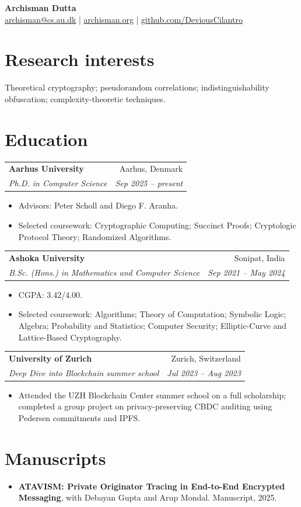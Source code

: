 \documentclass[10pt,a4paper]{article}
\makeatletter
\newcommand{\cvheading}[4]{%
  \begin{tabular*}{\textwidth}{@{\extracolsep{\fill}} l r}
    \textbf{#1} & #2 \\
    \emph{#3} & \emph{#4}
  \end{tabular*}
  \vspace{-0.35em}
}
\makeatother
\begin{document}
\begin{center}
  {\LARGE \textbf{Archisman Dutta}}\\[0.35em]
  \href{mailto:archisman@cs.au.dk}{archisman@cs.au.dk} \;|\;
  \href{https://archisman.org}{archisman.org} \;|\;
  \href{https://github.com/DeviousCilantro}{github.com/DeviousCilantro}
\end{center}

\section*{Research interests}
Theoretical cryptography; pseudorandom correlations; indistinguishability obfuscation; complexity-theoretic techniques.

\section*{Education}
\cvheading{Aarhus University}{Aarhus, Denmark}{Ph.D. in Computer Science}{Sep 2025 -- present}
\begin{itemize}
  \item Advisors: Peter Scholl and Diego F. Aranha.
  \item Selected coursework: Cryptographic Computing; Succinct Proofs; Cryptologic Protocol Theory; Randomized Algorithms.
\end{itemize}

\cvheading{Ashoka University}{Sonipat, India}{B.Sc. (Hons.) in Mathematics and Computer Science}{Sep 2021 -- May 2024}
\begin{itemize}
  \item CGPA: 3.42/4.00.
  \item Selected coursework: Algorithms; Theory of Computation; Symbolic Logic; Algebra; Probability and Statistics; Computer Security; Elliptic-Curve and Lattice-Based Cryptography.
\end{itemize}

\cvheading{University of Zurich}{Zurich, Switzerland}{Deep Dive into Blockchain summer school}{Jul 2023 -- Aug 2023}
\begin{itemize}
  \item Attended the UZH Blockchain Center summer school on a full scholarship; completed a group project on privacy-preserving CBDC auditing using Pedersen commitments and IPFS.
\end{itemize}

\section*{Manuscripts}
\begin{itemize}
  \item \textbf{ATAVISM: Private Originator Tracing in End-to-End Encrypted Messaging}, with Debayan Gupta and Arup Mondal. Manuscript, 2025.
\end{itemize}
\end{document}
